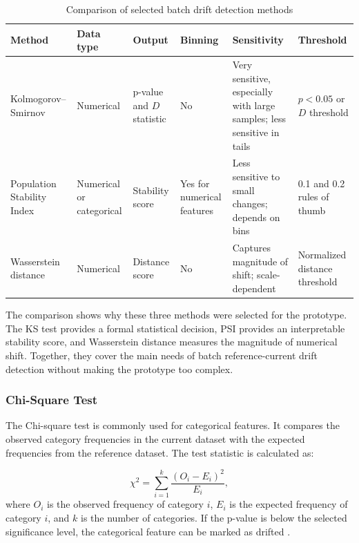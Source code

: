 \begin{table}[h]
\centering
\begin{tabular}{p{} p{} p{} p{} p{} p{}}
\hline
\textbf{Method} & \textbf{Data type} & \textbf{Output} & \textbf{Binning} & \textbf{Sensitivity} & \textbf{Threshold} \\
\hline
Kolmogorov--Smirnov & Numerical & p-value and $D$ statistic & No & Very sensitive, especially with large samples; less sensitive in tails & $p < 0.05$ or $D$ threshold \\
Population Stability Index & Numerical or categorical & Stability score & Yes for numerical features & Less sensitive to small changes; depends on bins & 0.1 and 0.2 rules of thumb \\
Wasserstein distance & Numerical & Distance score & No & Captures magnitude of shift; scale-dependent & Normalized distance threshold \\
\hline
\end{tabular}
\caption{Comparison of selected batch drift detection methods}
\label{tab:selected-batch-drift-methods}
\end{table}
The comparison shows why these three methods were selected for the prototype. The KS test provides a formal statistical decision, PSI provides an interpretable stability score, and Wasserstein distance measures the magnitude of numerical shift. Together, they cover the main needs of batch reference-current drift detection without making the prototype too complex.

\subsubsection{Chi-Square Test}

The Chi-square test is commonly used for categorical features. It compares the observed category frequencies in the current dataset with the expected frequencies from the reference dataset. The test statistic is calculated as:

\begin{equation}
\chi^2 = \sum_{i=1}^{k} \frac{(O_i - E_i)^2}{E_i},
\end{equation}
where $O_i$ is the observed frequency of category $i$, $E_i$ is the expected frequency of category $i$, and $k$ is the number of categories. If the p-value is below the selected significance level, the categorical feature can be marked as drifted \cite{SciPyDocumentation}.

